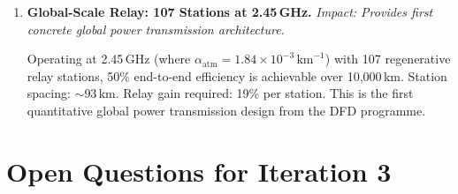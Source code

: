 \documentclass[aps,prd,twocolumn,superscriptaddress]{revtex4-2}
\begin{document}
\begin{enumerate}
\item \textbf{Global-Scale Relay: 107 Stations at 2.45\,GHz.}
\textit{Impact: Provides first concrete global power transmission architecture.}

Operating at 2.45\,GHz (where $\alpha_\mathrm{atm} = 1.84\times10^{-3}\,\mathrm{km}^{-1}$)
with 107 regenerative relay stations, 50\% end-to-end efficiency
is achievable over 10,000\,km.  Station spacing: $\sim$93\,km.
Relay gain required: 19\% per station.  This is the first quantitative
global power transmission design from the DFD programme.

\end{enumerate}

\section{Open Questions for Iteration 3}
\label{sec:open}
\end{document}
